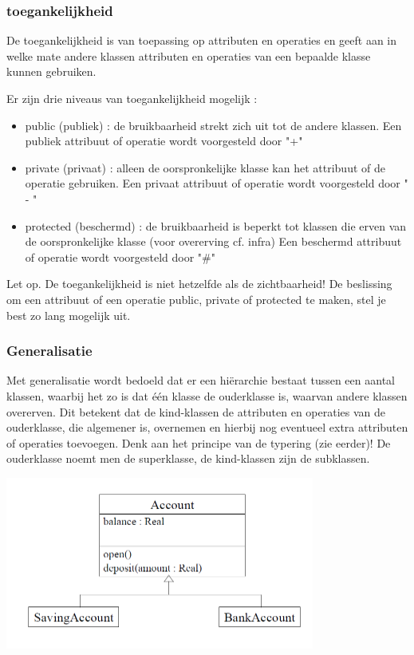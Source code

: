 \subsubsection{toegankelijkheid}

De toegankelijkheid is van toepassing op attributen en operaties en geeft aan in welke mate andere klassen attributen en operaties van een bepaalde klasse kunnen gebruiken.

Er zijn drie niveaus van toegankelijkheid mogelijk :

\begin{itemize}
    \item public (publiek) :
de bruikbaarheid strekt zich uit tot de andere klassen.
Een publiek attribuut of operatie wordt voorgesteld door "+"
    \item private (privaat) :
alleen de oorspronkelijke klasse kan het attribuut of de operatie gebruiken.
Een privaat attribuut of operatie wordt voorgesteld door " - "
    \item protected (beschermd) :
de bruikbaarheid is beperkt tot klassen die erven van de oorspronkelijke klasse (voor overerving cf. infra)
Een beschermd attribuut of operatie wordt voorgesteld door "\#"
\end{itemize}

Let op. De toegankelijkheid is niet hetzelfde als de zichtbaarheid!
De beslissing om een attribuut of een operatie public, private of protected te maken, stel je best zo lang mogelijk uit.

\subsubsection{Generalisatie}

Met generalisatie wordt bedoeld dat er een hiërarchie bestaat tussen een aantal klassen, waarbij het zo is dat één klasse de ouderklasse is, waarvan andere klassen overerven. Dit betekent dat de kind-klassen de attributen en operaties van de ouderklasse, die algemener is, overnemen en hierbij nog eventueel extra attributen of operaties toevoegen. Denk aan het principe van de typering (zie eerder)! De ouderklasse noemt men de superklasse, de kind-klassen zijn de subklassen.


\begin{center}
\includegraphics[width=4in]{img/con1}%
\end{center}

